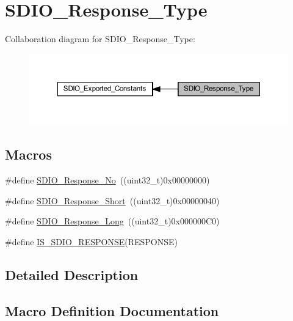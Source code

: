 \hypertarget{group___s_d_i_o___response___type}{}\section{S\+D\+I\+O\+\_\+\+Response\+\_\+\+Type}
\label{group___s_d_i_o___response___type}
Collaboration diagram for S\+D\+I\+O\+\_\+\+Response\+\_\+\+Type\+:
\nopagebreak
\begin{figure}[H]
\begin{center}
\leavevmode
\includegraphics[width=350pt]{group___s_d_i_o___response___type}
\end{center}
\end{figure}
\subsection*{Macros}
\begin{DoxyCompactItemize}
\item 
\#define \hyperlink{group___s_d_i_o___response___type_ga308b8ef0e79ba451644dda923bb3ac41}{S\+D\+I\+O\+\_\+\+Response\+\_\+\+No}~((uint32\+\_\+t)0x00000000)
\item 
\#define \hyperlink{group___s_d_i_o___response___type_ga1f61768f90641648fd5c12e8d2f7e508}{S\+D\+I\+O\+\_\+\+Response\+\_\+\+Short}~((uint32\+\_\+t)0x00000040)
\item 
\#define \hyperlink{group___s_d_i_o___response___type_ga1a11a8750612b344214f846784046bb0}{S\+D\+I\+O\+\_\+\+Response\+\_\+\+Long}~((uint32\+\_\+t)0x000000\+C0)
\item 
\#define \hyperlink{group___s_d_i_o___response___type_gae4df2359c9b637694b9baa220c16e062}{I\+S\+\_\+\+S\+D\+I\+O\+\_\+\+R\+E\+S\+P\+O\+N\+SE}(R\+E\+S\+P\+O\+N\+SE)
\end{DoxyCompactItemize}


\subsection{Detailed Description}


\subsection{Macro Definition Documentation}
\mbox{\label{group___s_d_i_o___response___type_gae4df2359c9b637694b9baa220c16e062}} 
